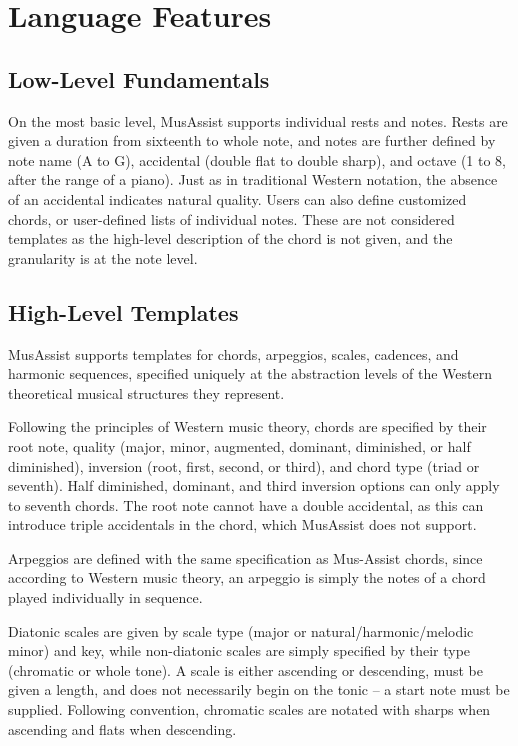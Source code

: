 \documentclass{article}
\begin{document}
\section{Language Features}\label{sec:language_features}
\subsection{Low-Level Fundamentals}
On the most basic level, MusAssist supports individual rests and notes. Rests are given a duration from sixteenth to whole note, and notes are further defined by note name (A to G), accidental (double flat to double sharp), and octave (1 to 8, after the range of a piano). Just as in traditional Western notation, the absence of an accidental indicates natural quality. Users can also define customized chords, or user-defined lists of individual notes. These are not considered templates as the high-level description of the chord is not given, and the granularity is at the note level.

\subsection{High-Level Templates}
MusAssist supports templates for chords, arpeggios, scales, cadences, and harmonic sequences, specified uniquely at the abstraction levels of the Western theoretical musical structures they represent.

Following the principles of Western music theory, chords are specified by their root note, quality (major, minor, augmented, dominant, diminished, or half diminished), inversion (root, first, second, or third), and chord type (triad or seventh). Half diminished, dominant, and third inversion options can only apply to seventh chords. The root note cannot have a double accidental, as this can introduce triple accidentals in the chord, which MusAssist does not support.

Arpeggios are defined with the same specification as Mus-Assist chords, since according to Western music theory, an arpeggio is simply the notes of a chord played individually in sequence.

Diatonic scales are given by scale type (major or natural/harmonic/melodic minor) and key, while non-diatonic scales are simply specified by their type (chromatic or whole tone). A scale is either ascending or descending, must be given a length, and does not necessarily begin on the tonic – a start note must be supplied. Following convention, chromatic scales are notated with sharps when ascending and flats when descending.
\end{document}
